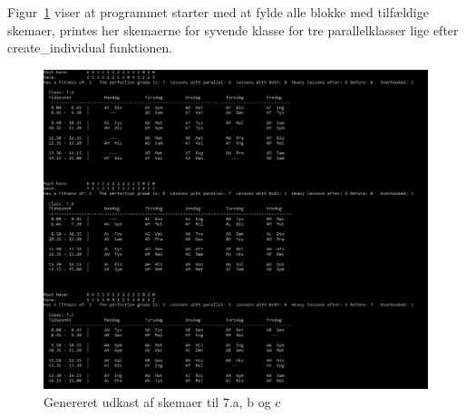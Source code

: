 Figur~\ref{fig:startsskema} viser at programmet starter med at fylde alle blokke med tilfældige skemaer, printes her skemaerne for syvende klasse for tre parallelklasser lige efter create\_individual funktionen.
\begin{figure}[h]
  \centering
  \includegraphics[width=\textwidth]{partials/graphics/startsskema.png}
  \caption{Genereret udkast af skemaer til 7.a, b og c }
  \label{fig:startsskema}
\end{figure}